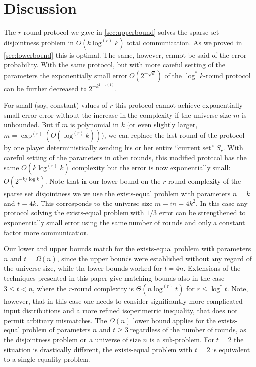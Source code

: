\section{Discussion}
\label{sec:discussion}
The $r$-round protocol we gave in \autoref{sec:upperbound}
solves the sparse set disjointness problem in $O(k\log^{(r)}k)$
total communication. As we proved in \autoref{sec:lowerbound}
this is optimal. The same, however, cannot be said of the error
probability. With the same protocol, but with more careful
setting of the parameters the exponentially small error
$O(2^{-\sqrt k})$ of the $\log^*k$-round protocol can be further
decreased to $2^{-k^{1-o(1)}}$.

For small (say, constant) values of $r$ this protocol cannot
achieve exponentially small error error without the increase in
the complexity if the universe size $m$ is unbounded. But if $m$
is polynomial in $k$ (or even slightly larger,
$m=\exp^{(r)}(O(\log^{(r)}k))$), we can replace the last round
of the protocol by one player deterministically sending his or
her entire ``current set'' $S_r$. With careful setting of the
parameters in other rounds, this modified protocol has the same
$O(k\log^{(r)}k)$ complexity but the error is now exponentially
small: $O(2^{-k/\log k})$. Note that in our lower bound on the
$r$-round complexity of the sparse set disjointness we we use
the exists-equal problem with parameters $n=k$ and $t=4k$. This
corresponds to the universe size $m=tn=4k^2$. In this case any
protocol solving the exists-equal problem with $1/3$ error can
be strengthened to exponentially small error using the same
number of rounds and only a constant factor more communication.

Our lower and upper bounds match for the exists-equal problem
with parameters $n$ and $t=\Omega(n)$, since the upper bounds
were established without any regard of the universe size, while
the lower bounds worked for $t=4n$. Extensions of the techniques
presented in this paper give matching bounds also in the case
$3\le t<n$, where the $r$-round complexity is
$\Theta(n\log^{(r)}t)$ for $r\le\log^*t$. Note, however, that in
this case one needs to consider significantly more complicated
input distributions and a more refined isoperimetric inequality,
that does not permit arbitrary mismatches. The $\Omega(n)$ lower
bound applies for the exists-equal problem of parameters $n$ and
$t\ge3$ regardless of the number of rounds, as the disjointness
problem on a universe of size $n$ is a sub-problem. For $t=2$
the situation is drastically different, the exists-equal problem
with $t=2$ is equivalent to a single equality problem.

